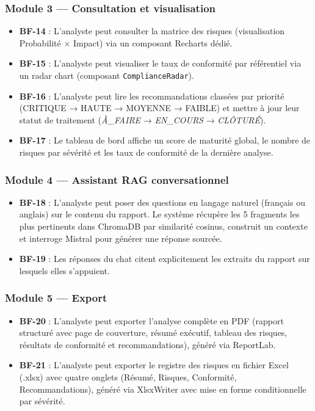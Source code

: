 \subsubsection*{Module 3 — Consultation et visualisation}

\begin{itemize}
  \item \textbf{BF-14} : L'analyste peut consulter la matrice des risques
    (visualisation Probabilité × Impact) via un composant Recharts dédié.
  \item \textbf{BF-15} : L'analyste peut visualiser le taux de conformité
    par référentiel via un radar chart (composant \texttt{ComplianceRadar}).
  \item \textbf{BF-16} : L'analyste peut lire les recommandations classées
    par priorité (CRITIQUE → HAUTE → MOYENNE → FAIBLE) et mettre à jour
    leur statut de traitement (\textit{À\_FAIRE} → \textit{EN\_COURS}
    → \textit{CLÔTURÉ}).
  \item \textbf{BF-17} : Le tableau de bord affiche un score de maturité
    global, le nombre de risques par sévérité et les taux de conformité
    de la dernière analyse.
\end{itemize}

\subsubsection*{Module 4 — Assistant RAG conversationnel}

\begin{itemize}
  \item \textbf{BF-18} : L'analyste peut poser des questions en langage
    naturel (français ou anglais) sur le contenu du rapport. Le système
    récupère les 5 fragments les plus pertinents dans ChromaDB par
    similarité cosinus, construit un contexte et interroge Mistral pour
    générer une réponse sourcée.
  \item \textbf{BF-19} : Les réponses du chat citent explicitement les
    extraits du rapport sur lesquels elles s'appuient.
\end{itemize}

\subsubsection*{Module 5 — Export}

\begin{itemize}
  \item \textbf{BF-20} : L'analyste peut exporter l'analyse complète en
    PDF (rapport structuré avec page de couverture, résumé exécutif,
    tableau des risques, résultats de conformité et recommandations),
    généré via ReportLab.
  \item \textbf{BF-21} : L'analyste peut exporter le registre des risques
    en fichier Excel (.xlsx) avec quatre onglets (Résumé, Risques,
    Conformité, Recommandations), généré via XlsxWriter avec mise en
    forme conditionnelle par sévérité.
\end{itemize}

